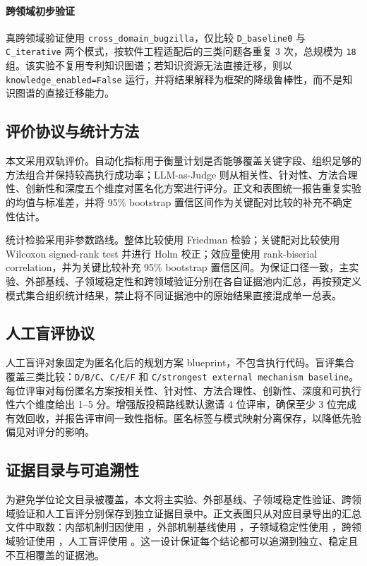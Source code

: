 \paragraph{跨领域初步验证}
真跨领域验证使用 \texttt{cross\_domain\_bugzilla}，仅比较 \texttt{D\_baseline0} 与 \texttt{C\_iterative} 两个模式，按软件工程适配后的三类问题各重复 3 次，总规模为 \texttt{18} 组。该实验不复用专利知识图谱；若知识资源无法直接迁移，则以 \texttt{knowledge\_enabled=False} 运行，并将结果解释为框架的降级鲁棒性，而不是知识图谱的直接迁移能力。

\subsection{评价协议与统计方法}

本文采用双轨评价。自动化指标用于衡量计划是否能够覆盖关键字段、组织足够的方法组合并保持较高执行成功率；LLM-as-Judge 则从相关性、针对性、方法合理性、创新性和深度五个维度对匿名化方案进行评分。正文和表图统一报告重复实验的均值与标准差，并将 95\% bootstrap 置信区间作为关键配对比较的补充不确定性估计。

统计检验采用非参数路线。整体比较使用 Friedman 检验；关键配对比较使用 Wilcoxon signed-rank test 并进行 Holm 校正；效应量使用 rank-biserial correlation，并为关键比较补充 95\% bootstrap 置信区间。为保证口径一致，主实验、外部基线、子领域稳定性和跨领域验证分别在各自证据池内汇总，再按预定义模式集合组织统计结果，禁止将不同证据池中的原始结果直接混成单一总表。

\subsection{人工盲评协议}

人工盲评对象固定为匿名化后的规划方案 blueprint，不包含执行代码。盲评集合覆盖三类比较：\texttt{D/B/C}、\texttt{C/E/F} 和 \texttt{C/strongest external mechanism baseline}。每位评审对每份匿名方案按相关性、针对性、方法合理性、创新性、深度和可执行性六个维度给出 1--5 分。增强版投稿路线默认邀请 4 位评审，确保至少 3 位完成有效回收，并报告评审间一致性指标。匿名标签与模式映射分离保存，以降低先验偏见对评分的影响。

\subsection{证据目录与可追溯性}

为避免学位论文目录被覆盖，本文将主实验、外部基线、子领域稳定性验证、跨领域验证和人工盲评分别保存到独立证据目录中。正文表图只从对应目录导出的汇总文件中取数：内部机制归因使用 \texttt{}，外部机制基线使用 \texttt{}，子领域稳定性使用 \texttt{}，跨领域验证使用 \texttt{}，人工盲评使用 \texttt{}。这一设计保证每个结论都可以追溯到独立、稳定且不互相覆盖的证据池。

